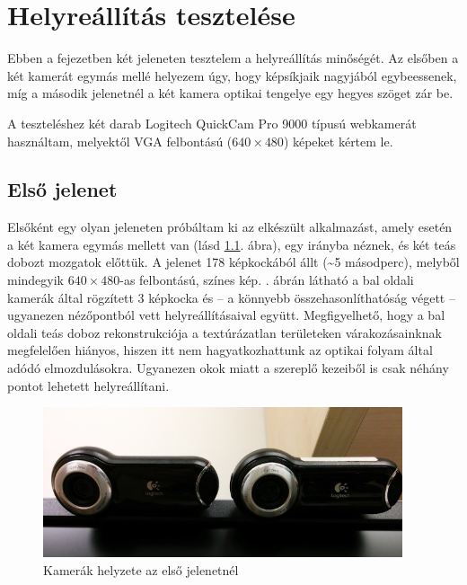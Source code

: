 \chapter{Helyreállítás tesztelése}

Ebben a fejezetben két jeleneten tesztelem a helyreállítás minőségét. Az elsőben a két kamerát egymás mellé helyezem úgy, hogy képsíkjaik nagyjából egybeessenek, míg a második jelenetnél a két kamera optikai tengelye egy hegyes szöget zár be.

A teszteléshez két darab Logitech QuickCam Pro 9000 típusú webkamerát használtam, melyektől VGA felbontású ($640\times 480$) képeket kértem le.

\section{Első jelenet}

Elsőként egy olyan jeleneten próbáltam ki az elkészült alkalmazást, amely esetén a két kamera egymás mellett van (lásd \ref{fig:scene1_camerapose}. ábra), egy irányba néznek, és két teás dobozt mozgatok előttük. A jelenet 178 képkockából állt (\textasciitilde 5 másodperc), melyből mindegyik $640\times 480$-as felbontású, színes kép. . ábrán látható a bal oldali kamerák által rögzített 3 képkocka és -- a könnyebb összehasonlíthatóság végett -- ugyanezen nézőpontból vett helyreállításaival együtt. Megfigyelhető, hogy a bal oldali teás doboz rekonstrukciója a textúrázatlan területeken várakozásainknak megfelelően hiányos, hiszen itt nem hagyatkozhattunk az optikai folyam által adódó elmozdulásokra. Ugyanezen okok miatt a szereplő kezeiből is csak néhány pontot lehetett helyreállítani.

\begin{figure}[tbh]
\centering
\includegraphics[width=300pt]{figures/scene1_camerapose.jpg}
\caption{Kamerák helyzete az első jelenetnél \label{fig:scene1_camerapose}}
\end{figure}

